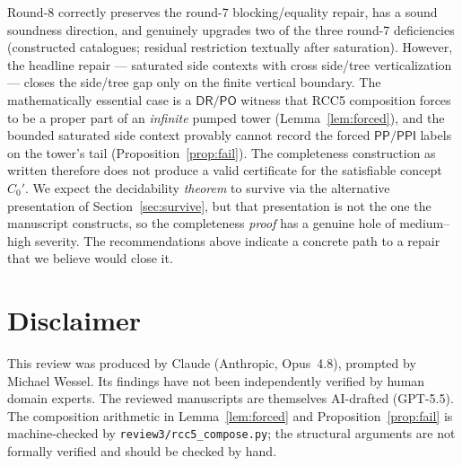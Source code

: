 \documentclass[11pt]{article}
\newcommand{\DR}{\mathsf{DR}}
\newcommand{\PO}{\mathsf{PO}}
\newcommand{\PP}{\mathsf{PP}}
\newcommand{\PPI}{\mathsf{PPI}}
\begin{document}
Round-8 correctly preserves the round-7 blocking/equality repair, has a sound
soundness direction, and genuinely upgrades two of the three round-7
deficiencies (constructed catalogues; residual restriction textually after
saturation).  However, the headline repair --- saturated side contexts with
cross side/tree verticalization --- closes the side/tree gap only on the finite
vertical boundary.  The mathematically essential case is a $\DR/\PO$ witness that
RCC5 composition forces to be a proper part of an \emph{infinite} pumped tower
(Lemma~\ref{lem:forced}), and the bounded saturated side context provably cannot
record the forced $\PP/\PPI$ labels on the tower's tail
(Proposition~\ref{prop:fail}).  The completeness construction as written
therefore does not produce a valid certificate for the satisfiable concept
$C_0'$.  We expect the decidability \emph{theorem} to survive via the alternative
presentation of Section~\ref{sec:survive}, but that presentation is not the one
the manuscript constructs, so the completeness \emph{proof} has a genuine hole of
medium--high severity.  The recommendations above indicate a concrete path to a
repair that we believe would close it.

\section*{Disclaimer}

This review was produced by Claude (Anthropic, Opus~4.8), prompted by Michael
Wessel.  Its findings have not been independently verified by human domain
experts.  The reviewed manuscripts are themselves AI-drafted (GPT-5.5).  The
composition arithmetic in Lemma~\ref{lem:forced} and Proposition~\ref{prop:fail}
is machine-checked by \texttt{review3/rcc5\_compose.py}; the structural
arguments are not formally verified and should be checked by hand.
\end{document}
